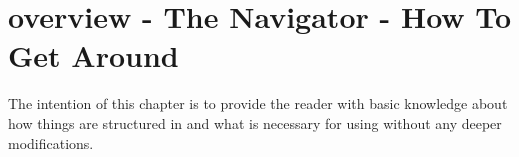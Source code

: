 \chapter[\Dumux overview - The \Dumux Navigator - How To Get Around]{\Dumux overview - The \Dumux Navigator - How To Get Around}

The intention of this chapter is to provide the reader with basic knowledge
about how things are structured in \Dumux and what is necessary for
using \Dumux without any deeper modifications.








